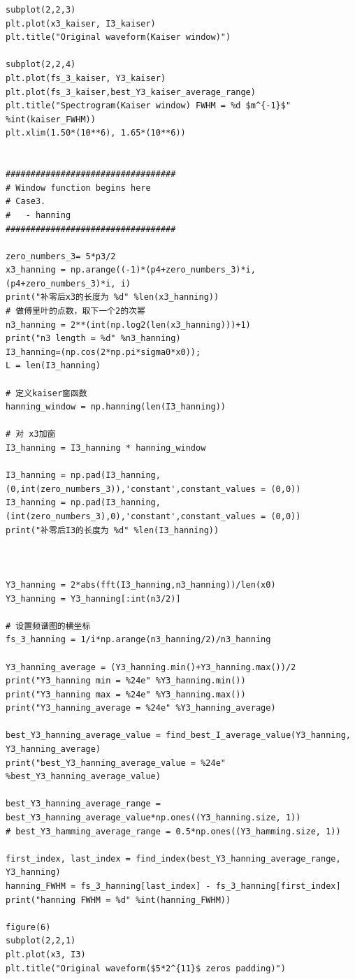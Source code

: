 \documentclass[conference]{IEEEtran}
\begin{document}
\begin{lstlisting}
subplot(2,2,3)
plt.plot(x3_kaiser, I3_kaiser)
plt.title("Original waveform(Kaiser window)")

subplot(2,2,4)
plt.plot(fs_3_kaiser, Y3_kaiser)
plt.plot(fs_3_kaiser,best_Y3_kaiser_average_range)
plt.title("Spectrogram(Kaiser window) FWHM = %d $m^{-1}$" %int(kaiser_FWHM))
plt.xlim(1.50*(10**6), 1.65*(10**6))


##################################
# Window function begins here
# Case3.
#   - hanning
##################################

zero_numbers_3= 5*p3/2
x3_hanning = np.arange((-1)*(p4+zero_numbers_3)*i, (p4+zero_numbers_3)*i, i)
print("补零后x3的长度为 %d" %len(x3_hanning)) 
# 做傅里叶的点数，取下一个2的次幂
n3_hanning = 2**(int(np.log2(len(x3_hanning)))+1)
print("n3 length = %d" %n3_hanning)
I3_hanning=(np.cos(2*np.pi*sigma0*x0));
L = len(I3_hanning)

# 定义kaiser窗函数
hanning_window = np.hanning(len(I3_hanning))

# 对 x3加窗
I3_hanning = I3_hanning * hanning_window

I3_hanning = np.pad(I3_hanning,(0,int(zero_numbers_3)),'constant',constant_values = (0,0))
I3_hanning = np.pad(I3_hanning,(int(zero_numbers_3),0),'constant',constant_values = (0,0))
print("补零后I3的长度为 %d" %len(I3_hanning)) 



Y3_hanning = 2*abs(fft(I3_hanning,n3_hanning))/len(x0)
Y3_hanning = Y3_hanning[:int(n3/2)]

# 设置频谱图的横坐标
fs_3_hanning = 1/i*np.arange(n3_hanning/2)/n3_hanning

Y3_hanning_average = (Y3_hanning.min()+Y3_hanning.max())/2
print("Y3_hanning min = %24e" %Y3_hanning.min())
print("Y3_hanning max = %24e" %Y3_hanning.max())
print("Y3_hanning_average = %24e" %Y3_hanning_average)

best_Y3_hanning_average_value = find_best_I_average_value(Y3_hanning, Y3_hanning_average)
print("best_Y3_hanning_average_value = %24e" %best_Y3_hanning_average_value)

best_Y3_hanning_average_range = best_Y3_hanning_average_value*np.ones((Y3_hanning.size, 1))
# best_Y3_hamming_average_range = 0.5*np.ones((Y3_hamming.size, 1))

first_index, last_index = find_index(best_Y3_hanning_average_range, Y3_hanning)
hanning_FWHM = fs_3_hanning[last_index] - fs_3_hanning[first_index]
print("hanning FWHM = %d" %int(hanning_FWHM))

figure(6)
subplot(2,2,1)
plt.plot(x3, I3)
plt.title("Original waveform($5*2^{11}$ zeros padding)")


\end{lstlisting}
\end{document}
